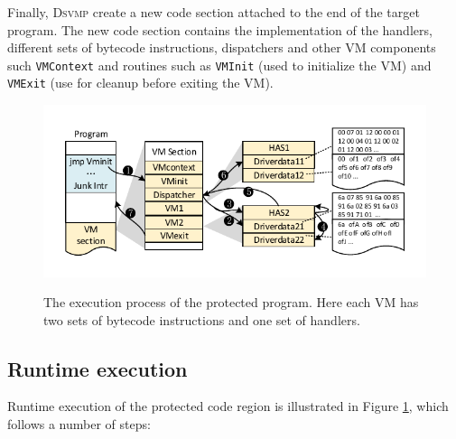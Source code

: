 \documentclass[times]{secauth}
\newcommand{\DSVMP}{\textsc{Dsvmp }}
\begin{document}

Finally, \DSVMP create a new code section attached to the end of the target program.
The new code section contains the implementation of the handlers, different sets of bytecode instructions,
dispatchers and other VM components such \texttt{VMContext} and routines such as
\texttt{VMInit} (used to initialize the VM) and \texttt{VMExit} (use for cleanup before exiting the VM).

\begin{figure}[!t]
  \centering
  \includegraphics[width=1.0\columnwidth]{figure/figex.pdf}\\
  \caption{The execution process of the protected program. Here each VM has two sets of bytecode instructions and one set of handlers.}\label{fig:Fig.5}
\end{figure}





\subsection{Runtime execution}
Runtime execution of the protected code region is illustrated in Figure \ref{fig:Fig.5}, which follows a number of steps:
\end{document}
